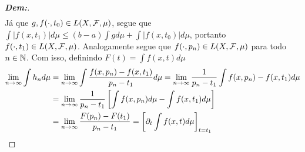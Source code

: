 \begin{proof}[\textbf{Dem:}]
\begin{align*}
  \end{align*}
  Já que $g, f(\cdot, t_0) \in L(X, \mathcal F, \mu)$, segue que $\int |f(x, t_1)|d\mu \le (b-a)\int g d\mu + \int |f(x, t_0)| d\mu$,
  portanto $f(\cdot, t_1) \in L(X,\mathcal F, \mu)$. Analogamente segue que $f(\cdot, p_n) \in L(X, \mathcal F, \mu)$ para todo 
  $n \in \mathbb N$. Com isso, definindo $F(t) = \int f(x, t) d\mu$
  \begin{align*}
    \lim_{n \rightarrow \infty} \int h_n d\mu &= \lim_{n \rightarrow \infty} 
    \int \frac{f(x, p_n) - f(x, t_1)}{p_n - t_1} d\mu 
    = \lim_{n \rightarrow \infty} \frac{1}{p_n - t_1} 
    \int f(x, p_n) - f(x, t_1) d\mu\\
    &= \lim_{n \rightarrow \infty} \frac{1}{p_n -t_1}\left[\int f(x, p_n)d\mu - \int f(x, t_1)d\mu\right]\\
    &= \lim_{n \rightarrow \infty} \frac{F(p_n) - F(t_1)}{p_n - t_1} = \left[\partial_t \int f(x, t) d\mu\right]_{t = t_1}
  \end{align*}
\end{proof}

